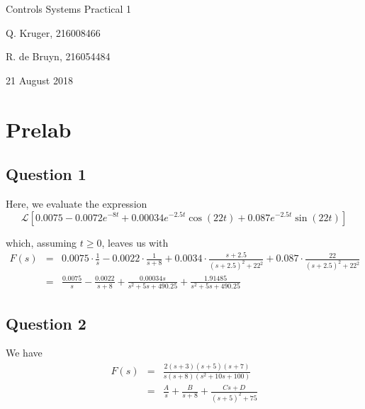 \documentclass[12pt, a4paper]{article}
\begin{document}
	\begin{titlepage}
		\centering
		{\LARGE Controls Systems Practical 1 \par}
		\vspace*{1.5cm}
		{\large Q. Kruger, 216008466 \par}
		{\large R. de Bruyn, 216054484 \par}
		\vspace*{1.2cm}
		{\large 21 August 2018}
		\vspace*{\fill}
		\vspace*{\fill}
	\end{titlepage}
	\tableofcontents
	\newpage

	\section{Prelab} %
	\label{sec:prelab}
	\subsection*{Question 1} %
	\label{sub:question_1_1}
		Here, we evaluate the expression
		\begin{equation}
			\label{eq:lolz}
			\mathcal{L}\left[0.0075 - 0.0072e^{-8t} + 0.00034e^{-2.5t}\cos(22t) + 0.087e^{-2.5t}\sin(22t)\right]
		\end{equation}

		\noindent which, assuming $t \ge 0$, leaves us with
		\[
			\begin{array}{rcl}
				F(s) & = & 0.0075 \cdot \frac{1}{s} - 0.0022 \cdot \frac{1}{s + 8} + 0.0034 \cdot \frac{s+2.5}{(s+2.5)^2 + 22^2} + 0.087 \cdot \frac{22}{(s+2.5)^2 + 22^2} \\
				& = & \frac{0.0075}{s} - \frac{0.0022}{s + 8} + \frac{0.00034s}{s^2 + 5s + 490.25} + \frac{1.91485}{s^2 + 5s + 490.25}
			\end{array}
		\]

	\subsection*{Question 2} %
	\label{sub:question_2_1}
		We have
		\[
			\begin{array}{rcl}
				F(s) & = & \frac{2(s+3)(s+5)(s+7)}{s(s+8)(s^2 + 10s + 100)} \\
				& = & \frac{A}{s} + \frac{B}{s+8} + \frac{Cs + D}{(s+5)^2 + 75} 
			\end{array}
		\]
\end{document}
